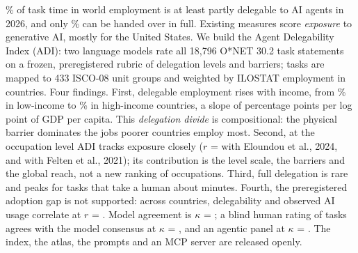 \% of task time in world employment is at least partly delegable to AI agents in 2026, and only \% can be handed over in full.
Existing measures score \emph{exposure} to generative AI, mostly for the United States.
We build the Agent Delegability Index (ADI): two language models rate all 18,796 O*NET 30.2 task statements on a frozen, preregistered rubric of delegation levels and barriers; tasks are mapped to 433 ISCO-08 unit groups and weighted by ILOSTAT employment in  countries.
Four findings.
First, delegable employment rises with income, from \% in low-income to \% in high-income countries, a slope of  percentage points per log point of GDP per capita.
This \emph{delegation divide} is compositional: the physical barrier dominates the jobs poorer countries employ most.
Second, at the occupation level ADI tracks exposure closely ($r$ =  with Eloundou et al., 2024, and  with Felten et al., 2021); its contribution is the level scale, the barriers and the global reach, not a new ranking of occupations.
Third, full delegation is rare and peaks for tasks that take a human about  minutes.
Fourth, the preregistered adoption gap is not supported: across  countries, delegability and observed AI usage correlate at $r$ = .
Model agreement is $\kappa$ = ; a blind human rating of  tasks agrees with the model consensus at $\kappa$ = , and an agentic panel at $\kappa$ = .
The index, the atlas, the prompts and an MCP server are released openly.
